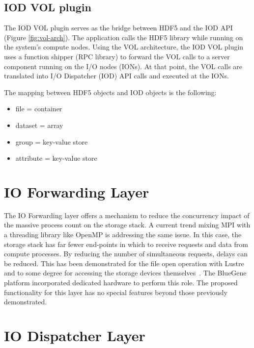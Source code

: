 \documentclass[conference]{IEEEtran}
\begin{document}
\subsection{IOD VOL plugin}
\label{iod-vol-plugin}

The IOD VOL plugin serves as the bridge between HDF5 and the IOD API (Figure \ref{fig:vol-arch}). The application calls the HDF5
library while running on the system's compute nodes. Using the VOL
architecture, the IOD VOL plugin uses a function shipper (RPC library)
to forward the VOL calls to a server component running on the I/O nodes
(IONs). At that point, the VOL calls are translated into I/O Dispatcher
(IOD) API calls and executed at the IONs.

The mapping between HDF5 objects and IOD objects is the following:

\begin{itemize}
\itemsep1pt\parskip0pt
\item
  file = container
\item
  dataset = array
\item
  group = key-value store
\item
  attribute = key-value store
\end{itemize}

\section{IO Forwarding Layer}
\label{sec:iof}

The IO Forwarding layer offers a mechanism to reduce the concurrency impact of
the massive process count on the storage stack. A current trend mixing MPI with
a threading library like OpenMP is addressing the same issue. In this case,
the storage stack has far fewer end-points in which to receive requests and
data from compute processes. By reducing the number of simultaneous requests,
delays can be reduced. This has been demonstrated for the file open operation
with Lustre~\cite{lofstead:2009:adaptable} and to some degree for accessing the
storage devices themselves~\cite{lofstead:2010:io-variability}. The BlueGene
platform incorporated dedicated hardware to perform this role. The proposed
functionality for this layer has no special features beyond those previously
demonstrated.

\section{IO Dispatcher Layer}
\label{sec:iod}
\end{document}
